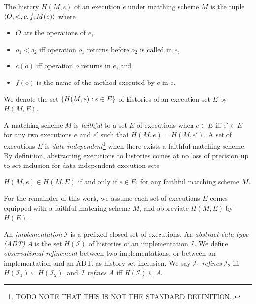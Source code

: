 The history $H(M,e)$ of an execution $e$ under matching scheme $M$ is the tuple
${\left\langle{O,<,c,f,M(e)}\right\rangle}$ where
\begin{itemize}

  \item $O$ are the operations of $e$,

  \item $o_1 < o_2$ if{f} operation $o_1$ returns before $o_2$ is called in $e$,

  \item $c(o)$ if{f} operation $o$ returns in $e$, and

  \item $f(o)$ is the name of the method executed by $o$ in $e$.

\end{itemize}
We denote the set ${\{{H(M,e) : e \in E}\}}$ of histories of an execution set $E$
by $H(M,E)$.

A matching scheme $M$ is \emph{faithful} to a set $E$ of executions when $e \in
E$ if{f} $e' \in E$ for any two executions $e$ and $e'$ such that $H(M,e) =
H(M,e')$. A set of executions $E$ is \emph{data independent}\footnote{TODO NOTE
THAT THIS IS NOT THE STANDARD DEFINITION…} when there exists a faithful
matching scheme. By definition, abstracting executions to histories comes at no
loss of precision up to set inclusion for data-independent execution sets.

\begin{lemma}

  $H(M,e) \in H(M,E)$ if and only if $e \in E$, for any faithful matching
  scheme $M$.

\end{lemma}

For the remainder of this work, we assume each set of executions $E$ comes
equipped with a faithful matching scheme $M$, and abbreviate $H(M,E)$ by $H(E)$.

An \emph{implementation} $\mathcal{I}$ is a prefixed-closed set of executions.
An \emph{abstract data type (ADT)} $A$ is the set $H(\mathcal{I})$ of histories
of an implementation $\mathcal{I}$. We define \emph{observational refinement}
between two implementations, or between an implementation and an ADT, as
history-set inclusion. We say $\mathcal{I}_1$ \emph{refines} $\mathcal{I}_2$
if{f} $H(\mathcal{I}_1) \subseteq H(\mathcal{I}_2)$, and $\mathcal{I}$
\emph{refines} $A$ if{f} $H(\mathcal{I}) \subseteq A$.

